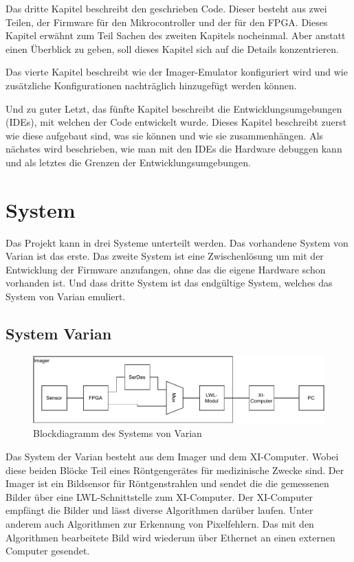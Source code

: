 \documentclass{article}
\begin{document}
Das dritte Kapitel beschreibt den geschrieben Code. Dieser besteht aus zwei Teilen, der Firmware für den Mikrocontroller und der für den FPGA. Dieses Kapitel erwähnt zum Teil Sachen des zweiten Kapitels nocheinmal. Aber anstatt einen Überblick zu geben, soll dieses Kapitel sich auf die Details konzentrieren.

Das vierte Kapitel beschreibt wie der Imager-Emulator konfiguriert wird und wie zusätzliche Konfigurationen nachträglich hinzugefügt werden können.

Und zu guter Letzt, das fünfte Kapitel beschreibt die Entwicklungsumgebungen (IDEs), mit welchen der Code entwickelt wurde. Dieses Kapitel beschreibt zuerst wie diese aufgebaut sind, was sie können und wie sie zusammenhängen. Als nächstes wird beschrieben, wie man mit den IDEs die Hardware debuggen kann und als letztes die Grenzen der Entwicklungsumgebungen.

\clearpage
\section{System}
Das Projekt kann in drei Systeme unterteilt werden. Das vorhandene System von Varian ist das erste. Das zweite System ist eine Zwischenlösung um mit der Entwicklung der Firmware anzufangen, ohne das die eigene Hardware schon vorhanden ist. Und dass dritte System ist das endgültige System, welches das System von Varian emuliert.

\subsection{System Varian}
\begin{figure}[tb]
    \includegraphics[width=\linewidth]{drawio/bd_varian}
    \caption{Blockdiagramm des Systems von Varian}
    \label{fig:bd_varian}
\end{figure}

Das System der Varian besteht aus dem Imager und dem XI-Computer. Wobei diese beiden Blöcke Teil eines Röntgengerätes für medizinische Zwecke sind. Der Imager ist ein Bildsensor für Röntgenstrahlen und sendet die die gemessenen Bilder über eine LWL-Schnittstelle zum XI-Computer. Der XI-Computer empfängt die Bilder und lässt diverse Algorithmen darüber laufen. Unter anderem auch Algorithmen zur Erkennung von Pixelfehlern. Das mit den Algorithmen bearbeitete Bild wird wiederum über Ethernet an einen externen Computer gesendet.
\end{document}
